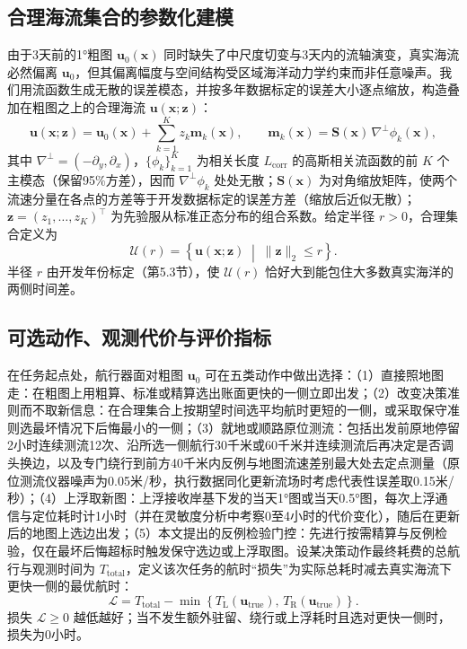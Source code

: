 \subsection{合理海流集合的参数化建模}
由于3天前的1°粗图 $\boldsymbol{u}_0(\boldsymbol{x})$ 同时缺失了中尺度切变与3天内的流轴演变，真实海流必然偏离 $\boldsymbol{u}_0$，但其偏离幅度与空间结构受区域海洋动力学约束而非任意噪声。我们用流函数生成无散的误差模态，并按多年数据标定的误差大小逐点缩放，构造叠加在粗图之上的合理海流 $\boldsymbol{u}(\boldsymbol{x}; \boldsymbol{z})$：
\begin{equation}
\boldsymbol{u}(\boldsymbol{x}; \boldsymbol{z}) = \boldsymbol{u}_0(\boldsymbol{x}) + \sum_{k=1}^{K} z_k \boldsymbol{m}_k(\boldsymbol{x}), \qquad \boldsymbol{m}_k(\boldsymbol{x}) = \mathbf{S}(\boldsymbol{x})\, \nabla^{\perp}\phi_k(\boldsymbol{x}),
\label{eq:plausible_field}
\end{equation}
其中 $\nabla^{\perp} = (-\partial_y, \partial_x)$，$\{\phi_k\}_{k=1}^{K}$ 为相关长度 $L_{\text{corr}}$ 的高斯相关流函数的前 $K$ 个主模态（保留95\%方差），因而 $\nabla^{\perp}\phi_k$ 处处无散；$\mathbf{S}(\boldsymbol{x})$ 为对角缩放矩阵，使两个流速分量在各点的方差等于开发数据标定的误差方差（缩放后近似无散）；$\boldsymbol{z} = (z_1, \dots, z_K)^{\top}$ 为先验服从标准正态分布的组合系数。给定半径 $r > 0$，合理集合定义为
\begin{equation}
\mathcal{U}(r) = \left\{ \boldsymbol{u}(\boldsymbol{x}; \boldsymbol{z}) \;\middle|\; \|\boldsymbol{z}\|_2 \le r \right\}.
\label{eq:plausible_set}
\end{equation}
半径 $r$ 由开发年份标定（第5.3节），使 $\mathcal{U}(r)$ 恰好大到能包住大多数真实海洋的两侧时间差。

\subsection{可选动作、观测代价与评价指标}
在任务起点处，航行器面对粗图 $\boldsymbol{u}_0$ 可在五类动作中做出选择：（1）直接照地图走：在粗图上用粗算、标准或精算选出账面更快的一侧立即出发；（2）改变决策准则而不取新信息：在合理集合上按期望时间选平均航时更短的一侧，或采取保守准则选最坏情况下后悔最小的一侧；（3）就地或顺路原位测流：包括出发前原地停留2小时连续测流12次、沿所选一侧航行30千米或60千米并连续测流后再决定是否调头换边，以及专门绕行到前方40千米内反例与地图流速差别最大处去定点测量（原位测流仪器噪声为0.05米/秒，执行数据同化更新流场时考虑代表性误差取0.15米/秒\cite{anderson2001eakf}）；（4）上浮取新图：上浮接收岸基下发的当天1°图或当天0.5°图，每次上浮通信与定位耗时计1小时（并在灵敏度分析中考察0至4小时的代价变化），随后在更新后的地图上选边出发；（5）本文提出的反例检验门控：先进行按需精算与反例检验，仅在最坏后悔超标时触发保守选边或上浮取图。设某决策动作最终耗费的总航行与观测时间为 $T_{\text{total}}$，定义该次任务的航时“损失”为实际总耗时减去真实海流下更快一侧的最优航时：
\begin{equation}
\mathcal{L} = T_{\text{total}} - \min\left\{ T_{\text{L}}(\boldsymbol{u}_{\text{true}}),\, T_{\text{R}}(\boldsymbol{u}_{\text{true}}) \right\}.
\label{eq:loss}
\end{equation}
损失 $\mathcal{L} \ge 0$ 越低越好；当不发生额外驻留、绕行或上浮耗时且选对更快一侧时，损失为0小时。

